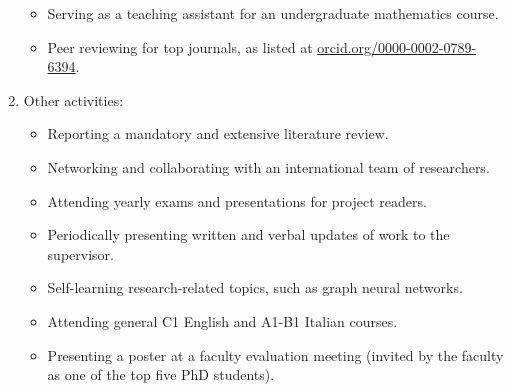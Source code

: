 \begin{enumerate}[leftmargin=*]
    \begin{itemize}
        \item Serving as a teaching assistant for an undergraduate mathematics course.
        \item Peer reviewing for top journals, as listed at \href{https://orcid.org/0000-0002-0789-6394}{orcid.org/0000-0002-0789-6394}.
    \end{itemize}
    \item Other activities:
    \begin{itemize}
        \item Reporting a mandatory and extensive literature review.
        \item Networking and collaborating with an international team of researchers.
        \item Attending yearly exams and presentations for project readers.
        \item Periodically presenting written and verbal updates of work to the supervisor.
        \item Self-learning research-related topics, such as graph neural networks.
        \item Attending general C1 English and A1-B1 Italian courses.
        \item Presenting a poster at a faculty evaluation meeting (invited by the faculty as one of the top five PhD students).
    \end{itemize}
\end{enumerate}
